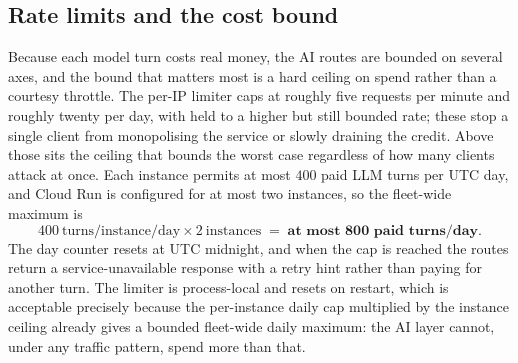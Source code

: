 \subsection{Rate limits and the cost bound}
\label{sec:ai-cost}

Because each model turn costs real money, the AI routes are bounded on several axes, and
the bound that matters most is a hard ceiling on spend rather than a courtesy throttle.
The per-IP limiter caps  at roughly five requests per minute and
roughly twenty per day, with  held to a higher but still bounded rate;
these stop a single client from monopolising the service or slowly draining the credit.
Above those sits the ceiling that bounds the worst case regardless of how many clients
attack at once. Each instance permits at most $400$ paid LLM turns per UTC day, and
Cloud Run is configured for at most two instances, so the fleet-wide maximum is
\[
  400 \ \text{turns/instance/day} \times 2 \ \text{instances}
  \;=\; \textbf{at most 800 paid turns/day}.
\]
The day counter resets at UTC midnight, and when the cap is reached the routes return a
service-unavailable response with a retry hint rather than paying for another turn. The
limiter is process-local and resets on restart, which is acceptable precisely because
the per-instance daily cap multiplied by the instance ceiling already gives a bounded
fleet-wide daily maximum: the AI layer cannot, under any traffic pattern, spend more
than that.
